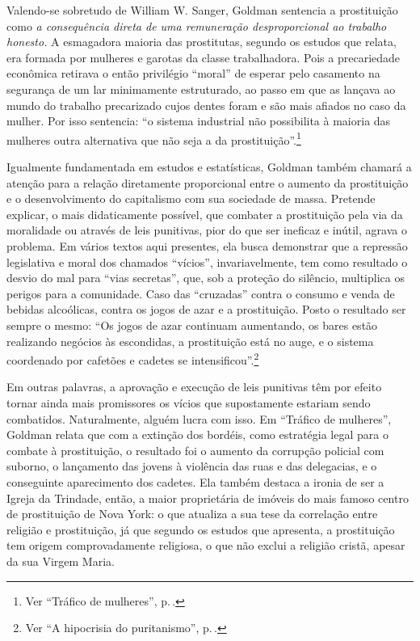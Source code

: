 Valendo-se sobretudo de William W. Sanger, Goldman sentencia a
prostituição como \emph{a consequência direta de uma remuneração
desproporcional ao trabalho honesto.} A esmagadora maioria das
prostitutas, segundo os estudos que relata, era formada por mulheres e
garotas da classe trabalhadora. Pois a precariedade econômica retirava
o então privilégio ``moral'' de esperar pelo casamento na segurança
de um lar minimamente estruturado, ao passo em que
as lançava ao mundo do trabalho precarizado cujos dentes
foram e são mais afiados no caso da mulher. Por isso sentencia:
``o sistema industrial não possibilita à maioria das mulheres outra alternativa que não seja a da prostituição''.\footnote{Ver ``Tráfico de mulheres'', p.\,\pageref{trafico}.}

Igualmente fundamentada em estudos e estatísticas, Goldman também
chamará a atenção para a relação diretamente proporcional entre o
aumento da prostituição e o desenvolvimento do capitalismo com sua
sociedade de massa. Pretende explicar, o mais didaticamente
possível, que combater a prostituição pela via da moralidade ou através
de leis punitivas, pior do que ser ineficaz e inútil, agrava o problema.
Em vários textos aqui presentes, ela busca demonstrar que a repressão
legislativa e moral dos chamados ``vícios'', invariavelmente, tem como
resultado o desvio do mal para ``vias secretas'', que, sob a proteção do silêncio,
multiplica os perigos para a comunidade.
Caso das
``cruzadas'' contra o consumo e venda de bebidas alcoólicas, contra os
jogos de azar e a prostituição. Posto o resultado ser sempre o mesmo:
``Os jogos de azar continuam aumentando, os bares estão realizando
negócios às escondidas, a prostituição está no auge, e o sistema
coordenado por cafetões e cadetes se intensificou''.\footnote{Ver ``A hipocrisia do puritanismo'', p.\,\pageref{hipocrisia}.}

Em outras palavras,
a aprovação e execução de leis punitivas têm por efeito tornar ainda
mais promissores os vícios que supostamente estariam sendo combatidos.
Naturalmente, alguém lucra com isso. Em ``Tráfico de mulheres'', Goldman
relata que com a extinção dos bordéis, como estratégia legal para o
combate à prostituição, o resultado foi o aumento da corrupção policial
com suborno, o lançamento das jovens à violência das ruas e das
delegacias, e o conseguinte aparecimento dos cadetes. Ela também
destaca a ironia de ser a Igreja da Trindade, então, a maior
proprietária de imóveis do mais famoso centro de prostituição de Nova
York: o que atualiza a sua tese da correlação entre religião e
prostituição, já que segundo os estudos que apresenta, a prostituição
tem origem comprovadamente religiosa, o que não exclui a religião
cristã, apesar da sua Virgem Maria. 


